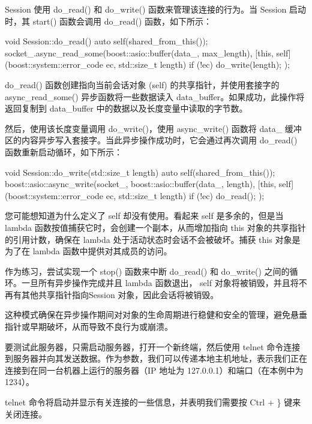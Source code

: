Session 使用 do\_read() 和 do\_write() 函数来管理该连接的行为。当 Session 启动时，其 start() 函数会调用 do\_read() 函数，如下所示：

\begin{cpp}
void Session::do_read() {
    auto self(shared_from_this());
    socket_.async_read_some(boost::asio::buffer(data_,
                                            max_length),
    [this, self](boost::system::error_code ec,
                 std::size_t length) {
        if (!ec) {
            do_write(length);
        }
    });
}
\end{cpp}

do\_read() 函数创建指向当前会话对象 (self) 的共享指针，并使用套接字的 async\_read\_some() 异步函数将一些数据读入 data\_buffer。如果成功，此操作将返回复制到 data\_buffer 中的数据以及长度变量中读取的字节数。

然后，使用该长度变量调用 do\_write()，使用 async\_write() 函数将 data\_ 缓冲区的内容异步写入套接字。当此异步操作成功时，它会通过再次调用 do\_read() 函数重新启动循环，如下所示：

\begin{cpp}
void Session::do_write(std::size_t length) {
    auto self(shared_from_this());
    boost::asio::async_write(socket_,
                             boost::asio::buffer(data_,
                                                 length),
    [this, self](boost::system::error_code ec,
                 std::size_t length) {
        if (!ec) {
            do_read();
        }
    });
}
\end{cpp}

您可能想知道为什么定义了 self 却没有使用。看起来 self 是多余的，但是当 lambda 函数按值捕获它时，会创建一个副本，从而增加指向 this 对象的共享指针的引用计数，确保在 lambda 处于活动状态时会话不会被破坏。捕获 this 对象是为了在 lambda 函数中提供对其成员的访问。

作为练习，尝试实现一个 stop() 函数来中断 do\_read() 和 do\_write() 之间的循环。一旦所有异步操作完成并且 lambda 函数退出， self 对象将被销毁，并且将不再有其他共享指针指向Session 对象，因此会话将被销毁。

这种模式确保在异步操作期间对对象的生命周期进行稳健和安全的管理，避免悬垂指针或早期破坏，从而导致不良行为或崩溃。

要测试此服务器，只需启动服务器，打开一个新终端，然后使用 telnet 命令连接到服务器并向其发送数据。作为参数，我们可以传递本地主机地址，表示我们正在连接到在同一台机器上运行的服务器（IP 地址为 127.0.0.1）和端口（在本例中为 1234）。

telnet 命令将启动并显示有关连接的一些信息，并表明我们需要按 Ctrl + \} 键来关闭连接。

